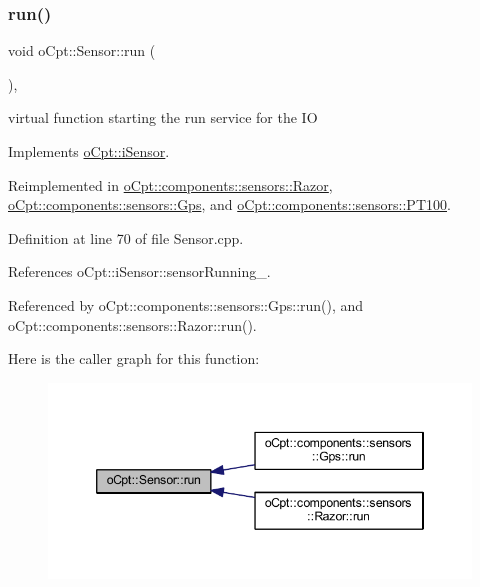\subsubsection{\texorpdfstring{run()}{run()}}
{\footnotesize\ttfamily void o\+Cpt\+::\+Sensor\+::run (\begin{DoxyParamCaption}{ }\end{DoxyParamCaption})\hspace{0.3cm}{\ttfamily [override]}, {\ttfamily [virtual]}}

virtual function starting the run service for the IO 

Implements \hyperlink{classo_cpt_1_1i_sensor_abbface05a16b17354c23389d9747bf7c}{o\+Cpt\+::i\+Sensor}.



Reimplemented in \hyperlink{classo_cpt_1_1components_1_1sensors_1_1_razor_ad93891ffb2d47e56d1417f0a40026c6e}{o\+Cpt\+::components\+::sensors\+::\+Razor}, \hyperlink{classo_cpt_1_1components_1_1sensors_1_1_gps_af703c48b8b7220a1909570f46edae932}{o\+Cpt\+::components\+::sensors\+::\+Gps}, and \hyperlink{classo_cpt_1_1components_1_1sensors_1_1_p_t100_a41dfc55a4be7993949feeb5ac013690d}{o\+Cpt\+::components\+::sensors\+::\+P\+T100}.



Definition at line 70 of file Sensor.\+cpp.



References o\+Cpt\+::i\+Sensor\+::sensor\+Running\+\_\+.



Referenced by o\+Cpt\+::components\+::sensors\+::\+Gps\+::run(), and o\+Cpt\+::components\+::sensors\+::\+Razor\+::run().

Here is the caller graph for this function\+:\nopagebreak
\begin{figure}[H]
\begin{center}
\leavevmode
\includegraphics[width=346pt]{classo_cpt_1_1_sensor_aef25b0e5f3a8358ee81c97c73909fbe6_icgraph}
\end{center}
\end{figure}
\hypertarget{classo_cpt_1_1_sensor_ae7d47e18df5eb7854bf71fbbee9568df}{}\label{classo_cpt_1_1_sensor_ae7d47e18df5eb7854bf71fbbee9568df} 
